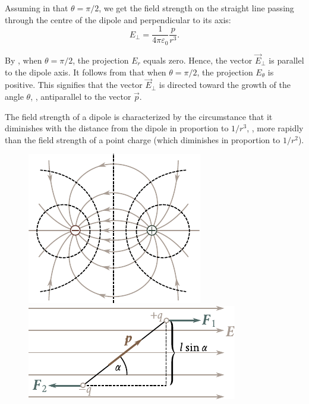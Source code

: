 Assuming in  that $\theta=\pi/2$, we get the field strength on the straight line passing through the centre of the dipole and perpendicular to its axis:
\begin{equation}\label{eq:1_56}
	E_{\perp} = \frac{1}{4\pi\varepsilon_0} \frac{p}{r^3}.
\end{equation}

\noindent
By , when $\theta=\pi/2$, the projection $E_r$ equals zero. Hence, the vector $\vec{E}_{\perp}$ is parallel to the dipole axis. It follows from  that when $\theta=\pi/2$, the projection $E_{\theta}$ is positive. This signifies that the vector $\vec{E}_{\perp}$ is directed toward the growth of the angle $\theta$, \ie, antiparallel to the vector $\vec{p}$.

The field strength of a dipole is characterized by the circumstance that it diminishes with the distance from the dipole in proportion to $1/r^3$, \ie, more rapidly than the field strength of a point charge (which diminishes in proportion to $1/r^2$).

\begin{figure}[t]
	\begin{minipage}[t]{0.5\linewidth}
		\begin{center}
			\includegraphics[scale=1]{figures/ch_01/fig_1_11.pdf}
			\caption[]{}
			\label{fig:1_11}
		\end{center}
	\end{minipage}
	\hspace{-0.05cm}
	\begin{minipage}[t]{0.5\linewidth}
		\begin{center}
			\includegraphics[scale=1]{figures/ch_01/fig_1_12.pdf}
			\caption[]{}
			\label{fig:1_12}
		\end{center}
	\end{minipage}
\vspace{-0.4cm}
\end{figure}

